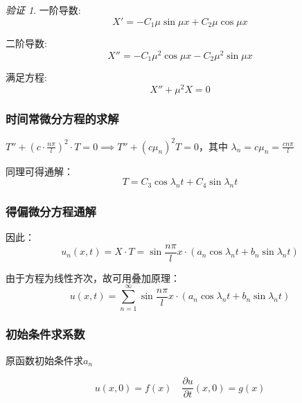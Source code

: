 \documentclass[a4paper, 12pt, oneside]{article} %
\numberwithin{subsection}{section}
\numberwithin{subsubsection}{subsection}
\theoremstyle{plain}
\theoremstyle{definition}
\theoremstyle{remark}
\newtheorem{verification}{验证}
\begin{document}
		\begin{verification}	
			一阶导数:
			\begin{equation*}
				X' = -C_1 \mu \sin \mu x + C_2 \mu \cos \mu x
			\end{equation*}
			
			二阶导数:
			\begin{equation*}
				X'' = -C_1 \mu^2 \cos \mu x - C_2 \mu^2 \sin \mu x
			\end{equation*}
			
			满足方程:
			\begin{equation*}
				X'' + \mu^2 X = 0
			\end{equation*}
		\end{verification}	
		
		
		\subsubsection{时间常微分方程的求解}
		\(T'' + \left(c \cdot \frac{n\pi}{l}\right)^2 \cdot T = 0 \implies T'' + (c \mu_n)^2 T = 0\)，其中 \(\lambda_n = c \mu_n = \frac{c n \pi}{l}\)
		
		同理可得通解：
		\begin{equation}
			T = C_3 \cos \lambda_n t + C_4 \sin \lambda_n t
		\end{equation}
		
		\subsubsection{得偏微分方程通解}
		因此：
		\begin{equation}
			u_n(x, t) = X \cdot T = \sin \frac{n\pi}{l} x \cdot (a_n \cos \lambda_n t + b_n \sin \lambda_n t)
		\end{equation}
		
		由于方程为线性齐次，故可用叠加原理：
		\begin{equation}
			u(x, t) = \sum_{n=1}^{\infty} \sin \frac{n\pi}{l} x \cdot (a_n \cos \lambda_n t + b_n \sin \lambda_n t)
		\end{equation}
		
		\subsubsection{初始条件求系数}
		原函数初始条件求$a_n$
		
		\begin{equation}
			u(x, 0) = f(x) \quad \frac{\partial u}{\partial t}(x, 0) = g(x)
		\end{equation}
		
\end{document}
